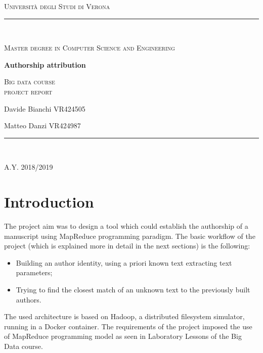 \documentclass[a4paper,11pt, twoside]{article}
\begin{document}
	\clearpage
	\begin{titlepage}
		\centering
		{\scshape\LARGE Università degli Studi di Verona \par}
		\noindent\rule{\textwidth}{0.5pt}\\
		{\scshape\large Master degree in Computer Science and Engineering\par}
		\vspace{6cm}
		{\huge\bfseries Authorship attribution\par}
		\vspace{1cm}
		{\Large\scshape Big data course\\ \large project report\par}
		\vspace{2cm}
		{\large Davide Bianchi VR424505\par
		\large Matteo Danzi VR424987\par}
		\vspace{1cm}
		\vspace{5cm}
		\vspace*{\fill}
		\noindent\rule{\textwidth}{0.5pt}\\
		{\large A.Y. 2018/2019\par}
	\end{titlepage}
	\thispagestyle{empty}
	\newpage
	\tableofcontents
	\newpage
	
	\section{Introduction}
	The project aim was to design a tool which could establish the authorship of a manuscript using MapReduce programming paradigm. The basic workflow of the project (which is explained more in detail in the next sections) is the following:\begin{itemize}
		\item Building an author identity, using a priori known text extracting text parameters;
		\item Trying to find the closest match of an unknown text to the previously built authors.
	\end{itemize}

	The used architecture is based on Hadoop, a distributed filesystem simulator, running in a Docker container. The requirements of the project imposed the use of MapReduce programming model as seen in Laboratory Lessons of the Big Data course.
	
\end{document}
